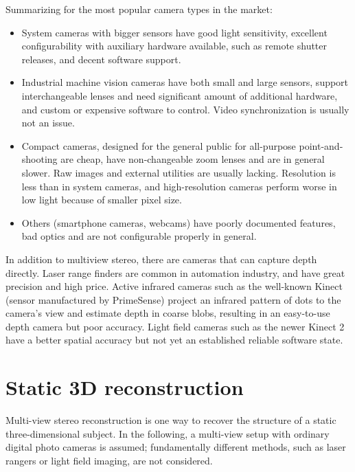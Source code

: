 Summarizing for the most popular camera types in the market:

\begin{itemize}
	\item System cameras with bigger sensors have good light sensitivity, excellent configurability with auxiliary hardware available, such as remote shutter releases, and decent software support.
	\item Industrial machine vision cameras have both small and large sensors, support interchangeable lenses and need significant amount of additional hardware, and custom or expensive software to control. Video synchronization is usually not an issue.
	\item Compact cameras, designed for the general public for all-purpose point-and-shooting are cheap, have non-changeable zoom lenses and are in general slower. Raw images and external utilities are usually lacking. Resolution is less than in system cameras, and high-resolution cameras perform worse in low light because of smaller pixel size.
	\item Others (smartphone cameras, webcams) have poorly documented features, bad optics and are not configurable properly in general.
\end{itemize}

In addition to multiview stereo, there are cameras that can capture depth directly.
Laser range finders are common in automation industry, and have great precision and high price.
Active infrared cameras such as the well-known Kinect (sensor manufactured by PrimeSense) project an infrared pattern of dots to the camera's view and estimate depth in coarse blobs, resulting in an easy-to-use depth camera but poor accuracy.
Light field cameras such as the newer Kinect 2 have a better spatial accuracy but not yet an established reliable software state.


\clearpage
\section{Static 3D reconstruction} \label{sec:static3d} %

Multi-view stereo reconstruction is one way to recover the structure of a static three-dimensional subject.
In the following, a multi-view setup with ordinary digital photo cameras is assumed;
fundamentally different methods, such as laser rangers or light field imaging, are not considered.

